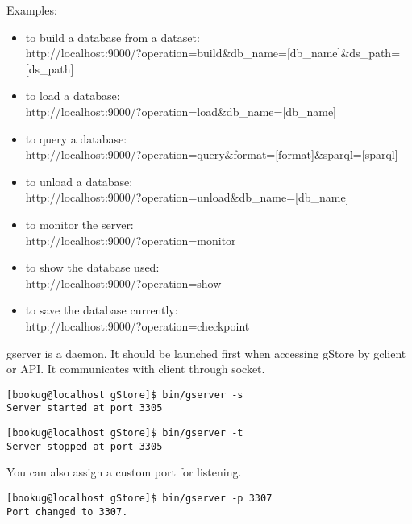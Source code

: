 \documentclass[titlepage, a4paper, 12pt]{article}
\begin{document}
Examples:

\begin{itemize}
	\item 
	to build a database from a dataset:\\
	http://localhost:9000/?operation=build\&db\_name=[db\_name]\&ds\_path=[ds\_path]
	\item 
	to load a database:\\
	http://localhost:9000/?operation=load\&db\_name=[db\_name]
	\item 
	to query a database:\\
	http://localhost:9000/?operation=query\&format=[format]\&sparql=[sparql]
	\item 
	to unload a database:\\
	http://localhost:9000/?operation=unload\&db\_name=[db\_name]
	\item 
	to monitor the server:\\
	http://localhost:9000/?operation=monitor
	\item 
	to show the database used:\\
	http://localhost:9000/?operation=show
	\item 
	to save the database currently:\\
	http://localhost:9000/?operation=checkpoint		
\end{itemize}



gserver is a daemon. It should be launched first when accessing gStore
by gclient or API. It communicates with client through socket.

\begin{verbatim}
[bookug@localhost gStore]$ bin/gserver -s
Server started at port 3305
\end{verbatim}

\begin{verbatim}
[bookug@localhost gStore]$ bin/gserver -t
Server stopped at port 3305
\end{verbatim}

You can also assign a custom port for listening.

\begin{verbatim}
[bookug@localhost gStore]$ bin/gserver -p 3307
Port changed to 3307.
\end{verbatim}
\end{document}
